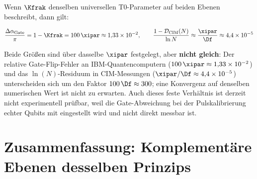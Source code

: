 Wenn $\Kfrak$ denselben universellen T0-Parameter auf beiden Ebenen beschreibt, dann
gilt:

\begin{equation}
    \frac{\Delta\alpha_{\text{Gate}}}{\pi} = 1 - \Kfrak = 100\,\xipar \approx 1{,}33 \times 10^{-2},
    \qquad
    \frac{1 - \mathcal{D}_{\text{CIM}}(N)}{\ln N} \approx \frac{\xipar}{\Df} \approx 4{,}4 \times 10^{-5}
    \label{eq:universal_kfrak}
\end{equation}

Beide Größen sind über dasselbe $\xipar$ festgelegt, aber \textbf{nicht gleich}: Der relative
Gate-Flip-Fehler an IBM-Quantencomputern ($100\,\xipar \approx 1{,}33 \times 10^{-2}$) und das
$\ln(N)$-Residuum in CIM-Messungen ($\xipar/\Df \approx 4{,}4 \times 10^{-5}$) unterscheiden sich
um den Faktor $100\,\Df \approx 300$; eine Konvergenz auf denselben numerischen Wert ist nicht zu erwarten.
Auch dieses feste Verhältnis ist derzeit nicht experimentell prüfbar, weil die Gate-Abweichung bei der Pulskalibrierung echter Qubits mit eingestellt wird und nicht direkt messbar ist.

\clearpage

\section{Zusammenfassung: Komplementäre Ebenen desselben Prinzips}
\label{sec:summary}

\begin{table}[h]
    \centering
    \caption{Vollständige Synthese: Beide Dokumente als komplementäre T0-Ebenen}
    \label{tab:synthesis}
\end{table}

